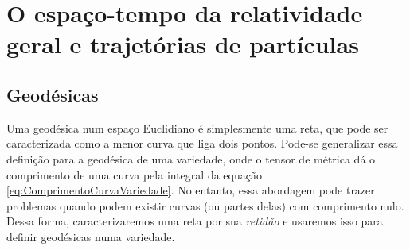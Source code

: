 \chapter{O espaço-tempo da relatividade geral e trajetórias de partículas}\label{cap:EspacoTempoRelatividadeGeralTrajetoriaParticulas}
\section{Geodésicas}\label{sec:Geodesicas}
Uma geodésica num espaço Euclidiano é simplesmente uma reta, que pode ser caracterizada como a menor curva que liga dois pontos. Pode-se generalizar essa definição para a geodésica de uma variedade, onde o tensor de métrica 
dá o comprimento de uma curva pela integral da equação \eqref{eq:ComprimentoCurvaVariedade}. No entanto, essa abordagem pode trazer problemas quando podem existir curvas (ou partes delas) com comprimento nulo. Dessa forma, caracterizaremos uma reta por sua \textit{retidão} e usaremos isso para definir geodésicas numa variedade.

